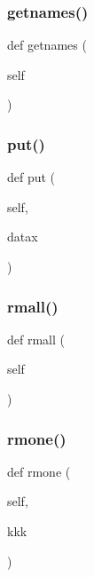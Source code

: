 \subsubsection{\texorpdfstring{getnames()}{getnames()}}
{\footnotesize\ttfamily def getnames (\begin{DoxyParamCaption}\item[{}]{self }\end{DoxyParamCaption})}

\mbox{\label{classpysql_1_1dibasql_ab8f0549b972cab1324c807f9ddc73c50}} 
\subsubsection{\texorpdfstring{put()}{put()}}
{\footnotesize\ttfamily def put (\begin{DoxyParamCaption}\item[{}]{self,  }\item[{}]{datax }\end{DoxyParamCaption})}

\mbox{\label{classpysql_1_1dibasql_ac439350e2ef8c576e97f5874419c93a9}} 
\subsubsection{\texorpdfstring{rmall()}{rmall()}}
{\footnotesize\ttfamily def rmall (\begin{DoxyParamCaption}\item[{}]{self }\end{DoxyParamCaption})}

\mbox{\label{classpysql_1_1dibasql_a80f032ac068650939402bccecbefdaf8}} 
\subsubsection{\texorpdfstring{rmone()}{rmone()}}
{\footnotesize\ttfamily def rmone (\begin{DoxyParamCaption}\item[{}]{self,  }\item[{}]{kkk }\end{DoxyParamCaption})}



